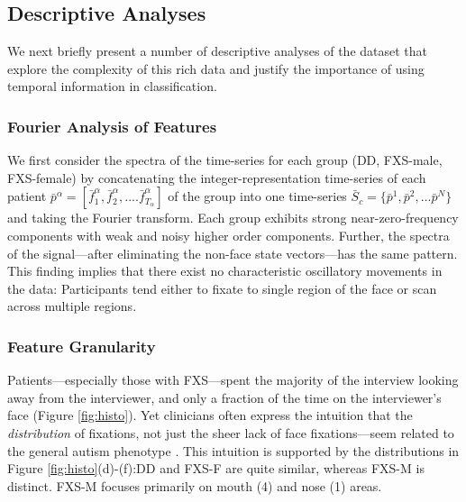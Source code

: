 \documentclass[10pt,twocolumn,letterpaper]{article}
\begin{document}
\subsection{Descriptive Analyses}

We next briefly present a number of descriptive analyses of the dataset that explore the complexity of this rich data and justify the importance of using temporal information in classification.

\subsubsection{Fourier Analysis of Features}

We first consider the spectra of the time-series for each group (DD, FXS-male, FXS-female) by concatenating the integer-representation time-series of each patient $\bar{p}^\alpha=[\bar{f}_1^\alpha, \bar{f}_2^\alpha,....\bar{f}_{T_\alpha}^\alpha]$ of the group into one time-series $\bar{S}_c=\{\bar{p}^1, \bar{p}^2,...\bar{p}^N \}$ and taking the Fourier transform. Each group exhibits strong near-zero-frequency components with weak and noisy higher order components. Further, the spectra of the signal---after eliminating the non-face state vectors---has the same pattern. This finding implies that there exist no characteristic oscillatory movements in the data: Participants tend either to fixate to single region of the face or scan across multiple regions. 

\subsubsection{Feature Granularity}

Patients---especially those with FXS---spent the majority of the interview looking away from the interviewer, and only a fraction of the time on the interviewer's face (Figure \ref{fig:histo}). Yet clinicians often express the intuition that the \emph{distribution} of fixations, not just the sheer lack of face fixations---seem related to the general autism phenotype \cite{klin2002,jones2013}. This intuition is supported by the distributions in Figure \ref{fig:histo}(d)-(f):DD and FXS-F are quite similar, whereas FXS-M is distinct. FXS-M focuses primarily on mouth (4) and nose (1) areas. 
\end{document}
